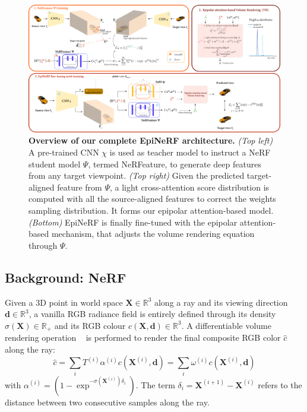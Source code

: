 \begin{figure}[htb!]
    \begin{center}
  \includegraphics[width=\linewidth]{images/epinerf/overview_3DVarchitecture.png}
  \end{center}
  \caption{\textbf{Overview of our complete EpiNeRF architecture.} \textit{(Top left)} A pre-trained CNN $\chi$ is used as teacher model to instruct a NeRF student model $\Psi$, termed NeRFeature, to generate deep features from any target viewpoint. \textit{(Top right)} Given the predicted target-aligned feature from $\Psi$, a light cross-attention score distribution is computed with all the source-aligned features to correct the weights sampling distribution. It forms our epipolar attention-based model. \textit{(Bottom)} EpiNeRF is finally fine-tuned with the epipolar attention-based mechanism, that adjusts the volume rendering equation through $\Psi$.}
  \label{fig:overview}
\end{figure}

\subsection{Background: NeRF}

Given a 3D point in world space $\mathbf{X} \in \mathbb{R}^{3}$ along a ray and its viewing direction $\mathbf{d} \in \mathbb{R}^{3}$, a vanilla RGB radiance field is entirely defined through its density $\sigma(\mathbf{X})\in \mathbb{R}_{+}$  and its RGB colour $c(\mathbf{X},\mathbf{d}) \in \mathbb{R}^{3}$. 
A differentiable volume rendering operation ~\citep{max1995optical} is performed to render the final composite RGB color $\hat{c}$ along the ray: 
\begin{equation}
\label{eq:main_nerf}
\hat{c}  = \sum_{i}T^{(i)}\alpha^{(i)}c(\mathbf{X}^{(i)},\mathbf{d}) = \sum_{i} \omega^{(i)}c(\mathbf{X}^{(i)},\mathbf{d})
\end{equation}
with $\alpha^{(i)} = (1-\exp^{-\sigma(\mathbf{X}^{(i)})\delta_{i}})$. The term $\delta_{i} = \mathbf{X}^{(i+1)} - \mathbf{X}^{(i)} $ refers to the distance between two consecutive samples along the ray.

